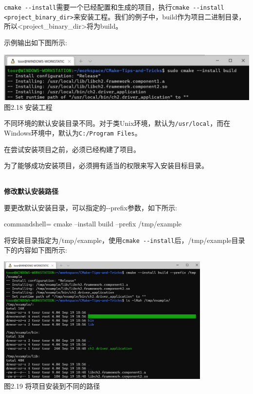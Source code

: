 \texttt{cmake -{}-install}需要一个已经配置和生成的项目，执行\texttt{cmake -{}-install <project\_binary\_dir>}来安装工程。我们的例子中，build作为项目二进制目录，所以<project\_binary\_dir>将为build。

示例输出如下图所示:

\begin{center}
\includegraphics[width=1.\textwidth]{content/1/chapter2/images/18.jpg}\\
图2.18 安装工程
\end{center}

不同环境的默认安装目录不同。对于类Unix环境，默认为\texttt{/usr/local}，而在Windows环境中，默认为\texttt{C:/Program Files}。

\begin{tcolorbox}[colback=webgreen!5!white,colframe=webgreen!75!black,title=Tip]
在尝试安装项目之前，必须已经构建了项目。

为了能够成功安装项目，必须拥有适当的权限来写入安装目标目录。
\end{tcolorbox}

\hspace*{\fill} \\ %
\noindent
\textbf{修改默认安装路径}

要更改默认安装目录，可以指定的-{}-prefix参数，如下所示:

\begin{tcblisting}{commandshell={}}
cmake --install build --prefix /tmp/example
\end{tcblisting}

将安装目录指定为/tmp/example，使用\texttt{cmake -{}-install}后，/tmp/example目录下的内容如下图所示:

\begin{center}
\includegraphics[width=0.8\textwidth]{content/1/chapter2/images/19.jpg}\\
图2.19 将项目安装到不同的路径
\end{center}

